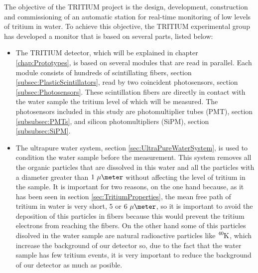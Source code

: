 The objective of the TRITIUM project is the design, development, construction and commissioning of an automatic station for real-time monitoring of low levels of tritium in water. To achieve this objective, the TRITIUM experimental group has developed a monitor that is based on several parts, listed below: 

\begin{itemize}

\item{} The TRITIUM detector, which will be explained in chapter \ref{chap:Prototypes}, is based on several modules that are read in parallel. Each module consists of hundreds of scintillating fibers, section \ref{subsec:PlasticScintillators}, read by two coincident photosensors, section \ref{subsec:Photosensors}. These scintillation fibers are directly in contact with the water sample the tritium level of which will be measured. The photosensors included in this study are photomultiplier tubes (PMT), section \ref{subsubsec:PMTs}, and silicon photomultipliers (SiPM), section \ref{subsubsec:SiPM}.

\item{} The ultrapure water system, section \ref{sec:UltraPureWaterSystem}, is used to condition the water sample before the measurement. This system removes all the organic particles that are dissolved in this water and all the particles with a diameter greater than $1~\mu\meter$ without affecting the level of tritium in the sample. It is important for two reasons, on the one hand because, as it has been seen in section \ref{sec:TritiumProperties}, the mean free path of tritium in water is very short, $5$ or $6~\mu\meter$,  so it is important to avoid the deposition of this particles in fibers because this would prevent the tritium electrons from reaching the fibers. On the other hand some of this particles disolved in the water sample are natural radioactive particles like $\ce{^{40}K}$, which increase the background of our detector so, due to the fact that the water sample has few tritium events, it is very important to reduce the background of our detector as much as posible.


\end{itemize}
